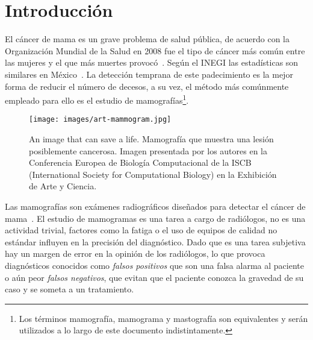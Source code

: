 \chapter{Introducción}
\label{generalidades}
 \setcounter{page}{1}


El cáncer de mama es un grave problema de salud pública, de acuerdo con la
Organización Mundial de la Salud en 2008 fue el tipo de cáncer más común entre
las mujeres y el que más muertes provocó~\cite{cancerreport}. Según el
INEGI las estadísticas son similares en México~\cite{mxcancer, inegi}. La
detección temprana de este padecimiento es la mejor forma de reducir el número
de decesos, a su vez, el método más comúnmente empleado para ello es el estudio
de mamografías\footnote{Los términos mamografía, mamograma y mastografía son
equivalentes y serán utilizados a lo largo de este documento indistintamente.}.

\begin{figure}[h]
    \centering

    \texttt{[image: images/art-mammogram.jpg]}

  \caption[An image that can save a life] {An image that can save a life.
      Mamografía que muestra una lesión posiblemente cancerosa. Imagen
      presentada por los autores en la  Conferencia Europea de Biología
      Computacional de la ISCB (International Society for Computational
  Biology) en la Exhibición de Arte y Ciencia.}

  \label{savealife}
\end{figure}

Las mamografías son exámenes radiográficos diseñados para detectar el cáncer de
mama~\cite{bushberg2011essential}. El estudio de mamogramas es una tarea a
cargo de radiólogos, no es una actividad trivial, factores como la fatiga o el
uso de equipos de calidad no estándar influyen en la precisión del diagnóstico.
Dado que es una tarea subjetiva hay un margen de error en la opinión de los
radiólogos, lo que provoca diagnósticos conocidos como \textit{falsos
positivos} que son una falsa alarma al paciente o aún peor \textit{falsos
negativos}, que evitan que el paciente conozca la gravedad de su caso y se
someta a un tratamiento.

